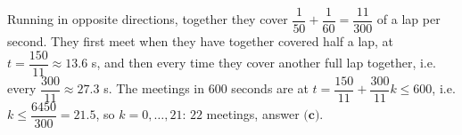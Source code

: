 Running in opposite directions, together they cover $\dfrac{1}{50}+\dfrac{1}{60}=\dfrac{11}{300}$ of a lap per second. They first meet when they have together covered half a lap, at $t=\dfrac{150}{11}\approx13.6$ s, and then every time they cover another full lap together, i.e. every $\dfrac{300}{11}\approx27.3$ s. The meetings in $600$ seconds are at $t=\dfrac{150}{11}+\dfrac{300}{11}k\le600$, i.e. $k\le\dfrac{6450}{300}=21.5$, so $k=0,\dots,21$: $\boxed{22}$ meetings, answer $\textbf{(c)}$.
